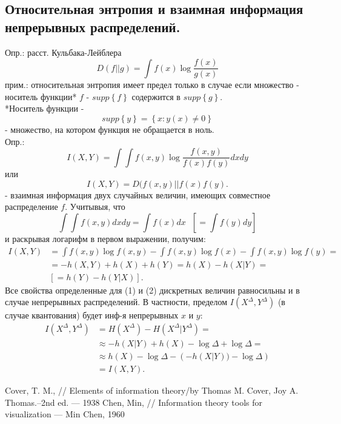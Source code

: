 \documentclass[12pt,a4paper]{scrartcl}
\begin{document}
	\subsection{Относительная энтропия и взаимная информация непрерывных распределений.}
	Опр.: расст. Кульбака-Лейблера
	\begin{equation}
	D(f||g) = \int f(x) \log \frac{f(x)}{g(x)}
	\end{equation}
	прим.: относительная энтропия имеет предел только в случае если множество - носитель функции* $f$ - $supp\left\{f\right\}$ содержится в $supp\left\{g\right\}$. \\
	*Носитель функции -
	\[
	supp\left\{y\right\} = \left\{x:y(x) \not = 0 \right\}
	\] 
	- множество, на котором функция не обращается в ноль.\\
	Опр.: \\
	\begin{equation}
		I(X, Y) = \int \int f(x, y) \log \frac{f(x, y)}{f(x) f(y)} dx dy
	\end{equation}
	или
	\[
		I(X, Y) = D (f (x, y) || f(x) f(y).
	\]
	- взаимная информация двух случайных величин, имеющих совместное распределение $f$.
	Учитывыя, что
	\[
	\int \int f(x, y) dx dy = \int f(x) dx \text{ } [ = \int f(y) dy]
	\]
	и раскрывая логарифм в первом выражении, получим:
	\[
	\begin{aligned}
		I(X, Y) & = \int f(x, y) \log f(x, y) - \int f(x, y) \log f(x) - \int f(x, y) \log f(y) = \\
		& = - h(X, Y) + h(X) + h(Y) = h(X) - h(X|Y) =\\
		& \left[ = h(Y) - h(Y | X) \right].
	\end{aligned}
	\]
	Все свойства определенные для (1) и (2) дискретных величин равносильны и в случае непрерывных распределений. В частности, пределом $I(X^{\Delta}, Y^{\Delta})$ (в случае квантования)  будет инф-я непрерывных $x$ и $y$:
	\[
	\begin{aligned}
		I(X^{\Delta}, Y^{\Delta}) & = H(X^{\Delta}) - H(X^{\Delta}|Y^{\Delta}) = \\
		& \approx -h(X|Y) + h(X) - \log \Delta + \log \Delta= \\
		& \approx  h(X) - \log \Delta - \left( -h(X|Y)) - \log \Delta \right) \\
		& = I(X, Y).
	\end{aligned}
	\]
	\begin{thebibliography}{3}
		Cover, T. M., // Elements of information theory/by Thomas M. Cover, Joy A. Thomas.–2nd ed. --- 1938 
		Chen, Min, // Information theory tools for visualization --- Min Chen, 1960
	\end{thebibliography}
\end{document}
